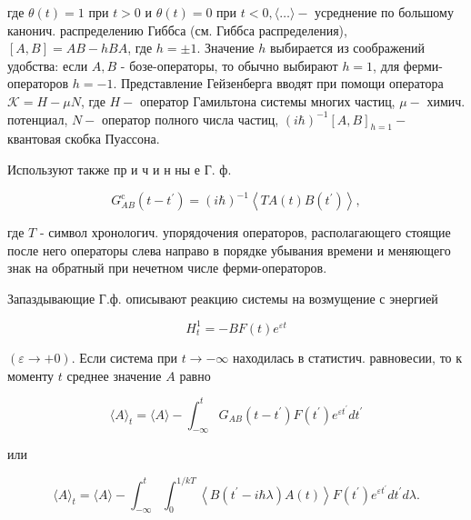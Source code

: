 \documentclass[10pt]{article}
\begin{document}
где $\theta(t)=1$ при $t>0$ и $\theta(t)=0$ при $t<0,\langle\ldots\rangle-$ усреднение по большому канонич. распределению Гиббса (см. Гиббса распределения), $[A, B]=A B-h B A$, где $h= \pm 1$. Значение $h$ выбирается из соображений удобства: если $A, B$ - бозе-операторы, то обычно выбирают $h=1$, для ферми-операторов $h=-1$. Представление Гейзенберга вводят при помощи оператора $\mathscr{K}=H-\mu N$, где $H-$ оператор Гамильтона системы многих частиц, $\mu-$ химич. потенциал, $N-$ оператор полного числа частиц, $(i \hbar)^{-1}[A, B]_{h=1}-$ квантовая скобка Пуассона.



Используют также пр и ч и н ны е Г. ф.



\[

G_{A B}^{\mathrm{c}}\left(t-t^{\prime}\right)=(i \hbar)^{-1}\left\langle T A(t) B\left(t^{\prime}\right)\right\rangle,

\]



где $T$ - символ хронологич. упорядочения операторов, располагающего стоящие после него операторы слева направо в порядке убывания времени и меняющего знак на обратный при нечетном числе ферми-операторов.



Запаздывающие Г.ф. описывают реакцию системы на возмущение с энергией



\[

H_{t}^{1}=-B F(t) e^{\varepsilon t}

\]



$(\varepsilon \rightarrow+0)$. Если система при $t \rightarrow-\infty$ находилась в статистич. равновесии, то к моменту $t$ среднее значение $A$ равно



\[

\langle A\rangle_{t}=\langle A\rangle-\int_{-\infty}^{t} G_{A B}\left(t-t^{\prime}\right) F\left(t^{\prime}\right) e^{\varepsilon t^{\prime}} d t^{\prime}

\]



или



\[

\langle A\rangle_{t}=\langle A\rangle-\int_{-\infty}^{t} \int_{0}^{1 / k T}\left\langle B\left(t^{\prime}-i \hbar \lambda\right) A(t)\right\rangle F\left(t^{\prime}\right) e^{\varepsilon t^{\prime}} d t^{\prime} d \lambda .

\]
\end{document}
